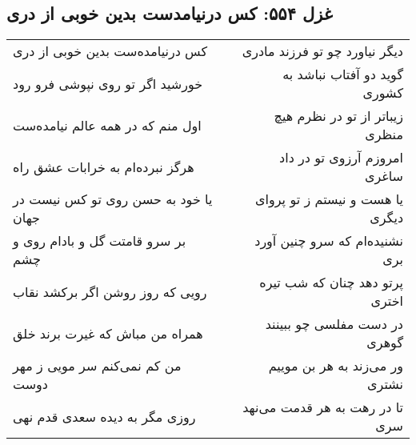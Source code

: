 \begin{center}
\section*{غزل ۵۵۴: کس درنیامدست بدین خوبی از دری}
\label{sec:554}
\begin{longtable}{l p{0.5cm} r}
کس درنیامده‌ست بدین خوبی از دری
&&
دیگر نیاورد چو تو فرزند مادری
\\
خورشید اگر تو روی نپوشی فرو رود
&&
گوید دو آفتاب نباشد به کشوری
\\
اول منم که در همه عالم نیامده‌ست
&&
زیباتر از تو در نظرم هیچ منظری
\\
هرگز نبرده‌ام به خرابات عشق راه
&&
امروزم آرزوی تو در داد ساغری
\\
یا خود به حسن روی تو کس نیست در جهان
&&
یا هست و نیستم ز تو پروای دیگری
\\
بر سرو قامتت گل و بادام روی و چشم
&&
نشنیده‌ام که سرو چنین آورد بری
\\
رویی که روز روشن اگر برکشد نقاب
&&
پرتو دهد چنان که شب تیره اختری
\\
همراه من مباش که غیرت برند خلق
&&
در دست مفلسی چو ببینند گوهری
\\
من کم نمی‌کنم سر مویی ز مهر دوست
&&
ور می‌زند به هر بن موییم نشتری
\\
روزی مگر به دیده سعدی قدم نهی
&&
تا در رهت به هر قدمت می‌نهد سری
\\
\end{longtable}
\end{center}
